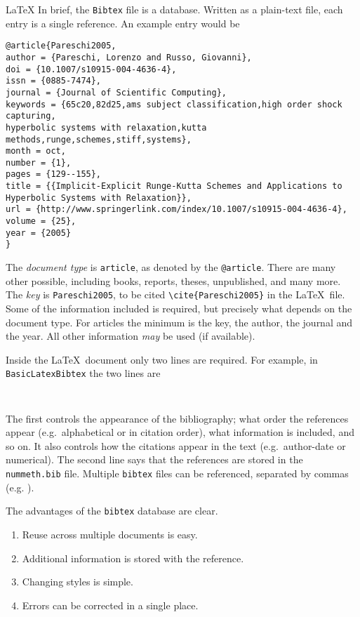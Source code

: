 \begin{chapter}{\LaTeX}
In brief, the \verb|Bibtex| file is a database. Written as a plain-text file, each entry is a single reference. An example entry would be
%
\begin{verbatim}
@article{Pareschi2005,
author = {Pareschi, Lorenzo and Russo, Giovanni},
doi = {10.1007/s10915-004-4636-4},
issn = {0885-7474},
journal = {Journal of Scientific Computing},
keywords = {65c20,82d25,ams subject classification,high order shock capturing,
hyperbolic systems with relaxation,kutta methods,runge,schemes,stiff,systems},
month = oct,
number = {1},
pages = {129--155},
title = {{Implicit-Explicit Runge-Kutta Schemes and Applications to
Hyperbolic Systems with Relaxation}},
url = {http://www.springerlink.com/index/10.1007/s10915-004-4636-4},
volume = {25},
year = {2005}
}
\end{verbatim}
%
The \emph{document type} is \verb|article|, as denoted by the \verb|@article|. There are many other possible, including books, reports, theses, unpublished, and many more. The \emph{key} is \verb|Pareschi2005|, to be cited \verb|\cite{Pareschi2005}| in the \LaTeX\ file. Some of the information included is required, but precisely what depends on the document type. For articles the minimum is the key, the author, the journal and the year. All other information \emph{may} be used (if available).

Inside the \LaTeX\ document only two lines are required. For example, in \verb|BasicLatexBibtex| the two lines are
%
\begin{verbatim}


\end{verbatim}
%
The first controls the appearance of the bibliography; what order the references appear (e.g.\ alphabetical or in citation order), what information is included, and so on. It also controls how the citations appear in the text (e.g.\ author-date or numerical). The second line says that the references are stored in the \verb|nummeth.bib| file. Multiple \verb|bibtex| files can be referenced, separated by commas (e.g. \verb||).

The advantages of the \verb|bibtex| database are clear.
%
\begin{enumerate}
\item Reuse across multiple documents is easy.
\item Additional information is stored with the reference.
\item Changing styles is simple.
\item Errors can be corrected in a single place.
\end{enumerate}
%


\end{chapter}
